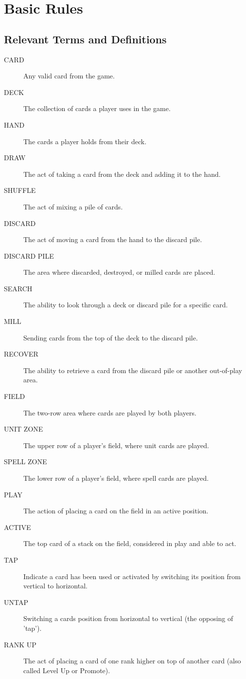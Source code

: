 \chapter{Basic Rules}

\section{Relevant Terms and Definitions}
\begin{description}
    \item[CARD] Any valid card from the game.
    \item[DECK] The collection of cards a player uses in the game.
    \item[HAND] The cards a player holds from their deck.
    \item[DRAW] The act of taking a card from the deck and adding it to the hand.
    \item[SHUFFLE] The act of mixing a pile of cards.
    \item[DISCARD] The act of moving a card from the hand to the discard pile.
    \item[DISCARD PILE] The area where discarded, destroyed, or milled cards are placed.
    \item[SEARCH] The ability to look through a deck or discard pile for a specific card.
    \item[MILL] Sending cards from the top of the deck to the discard pile.
    \item[RECOVER] The ability to retrieve a card from the discard pile or another out-of-play area.
    \item[FIELD] The two-row area where cards are played by both players.
    \item[UNIT ZONE] The upper row of a player’s field, where unit cards are played.
    \item[SPELL ZONE] The lower row of a player’s field, where spell cards are played.
    \item[PLAY] The action of placing a card on the field in an active position.
    \item[ACTIVE] The top card of a stack on the field, considered in play and able to act.
    \item[TAP] Indicate a card has been used or activated by switching its position from vertical to horizontal.
    \item[UNTAP] Switching a cards position from horizontal to vertical (the opposing of 'tap').
    \item[RANK UP] The act of placing a card of one rank higher on top of another card (also called Level Up or Promote).

\end{description}
